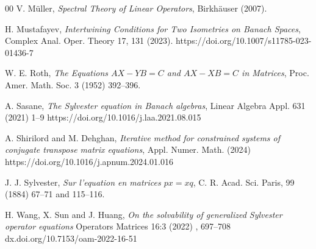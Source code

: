 \documentclass{article}
\theoremstyle{definition}
\begin{document}
\begin{thebibliography}{00}
 V. M\"uller, {\it Spectral Theory of Linear Operators}, Birkh\"auser (2007).

 H. Mustafayev,  {\it Intertwining Conditions for Two Isometries on Banach Spaces}, Complex Anal. Oper. Theory 17, 131 (2023). https://doi.org/10.1007/s11785-023-01436-7

 W. E. Roth, {\it The Equations $AX-YB=C$ and $AX-XB=C$ in Matrices}, Proc. Amer. Math. Soc. 3 (1952) 392--396.

 A. Sasane, {\it The Sylvester equation in Banach algebras}, Linear Algebra Appl. {631} (2021) 1--9 https://doi.org/10.1016/j.laa.2021.08.015

 A. Shirilord and M. Dehghan, {\it Iterative method for constrained systems of conjugate transpose matrix
equations}, Appl. Numer. Math. (2024) https://doi.org/10.1016/j.apnum.2024.01.016

 J. J. Sylvester, {\it Sur l'equation en matrices $px=xq$}, C. R. Acad. Sci. Paris, 99 (1884) 67--71 and 115--116.


 H. Wang, X. Sun and J. Huang, {\it On the solvability of generalized Sylvester operator equations} Operators Matrices 16:3 (2022) , 697--708 dx.doi.org/10.7153/oam-2022-16-51
\end{thebibliography}
\end{document}
